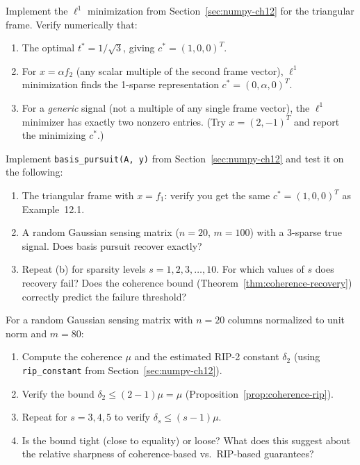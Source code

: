 \begin{exercisebox}[title={Lab Exercise 12.1: Reproducing Example 12.1}]
Implement the $\ell^1$ minimization from
Section~\ref{sec:numpy-ch12} for the triangular frame. Verify
numerically that:
\begin{enumerate}[label=(\alph*)]
  \item The optimal $t^* = 1/\sqrt{3}$, giving $c^*=(1,0,0)^T$.
  \item For $x = \alpha f_2$ (any scalar multiple of the second frame
        vector), $\ell^1$ minimization finds the 1-sparse representation
        $c^* = (0,\alpha,0)^T$.
  \item For a \emph{generic} signal (not a multiple of any single frame
        vector), the $\ell^1$ minimizer has exactly two nonzero entries.
        (Try $x=(2,-1)^T$ and report the minimizing $c^*$.)
\end{enumerate}
\end{exercisebox}

\begin{exercisebox}[title={Lab Exercise 12.2: Basis Pursuit via LP}]
Implement \texttt{basis\_pursuit(A, y)} from
Section~\ref{sec:numpy-ch12} and test it on the following:
\begin{enumerate}[label=(\alph*)]
  \item The triangular frame with $x=f_1$: verify you get the same
        $c^*=(1,0,0)^T$ as Example~12.1.
  \item A random Gaussian sensing matrix ($n=20$, $m=100$) with a
        3-sparse true signal. Does basis pursuit recover exactly?
  \item Repeat (b) for sparsity levels $s=1,2,3,\ldots,10$. For which
        values of $s$ does recovery fail? Does the coherence bound
        (Theorem~\ref{thm:coherence-recovery}) correctly predict
        the failure threshold?
\end{enumerate}
\end{exercisebox}

\begin{exercisebox}[title={Lab Exercise 12.3: The Coherence--RIP Connection}]
For a random Gaussian sensing matrix with $n=20$ columns normalized to
unit norm and $m=80$:
\begin{enumerate}[label=(\alph*)]
  \item Compute the coherence $\mu$ and the estimated RIP-2 constant
        $\delta_2$ (using \texttt{rip\_constant} from
        Section~\ref{sec:numpy-ch12}).
  \item Verify the bound $\delta_2\le(2-1)\mu=\mu$
        (Proposition~\ref{prop:coherence-rip}).
  \item Repeat for $s=3,4,5$ to verify $\delta_s\le(s-1)\mu$.
  \item Is the bound tight (close to equality) or loose? What does this
        suggest about the relative sharpness of coherence-based vs.\
        RIP-based guarantees?
\end{enumerate}
\end{exercisebox}

